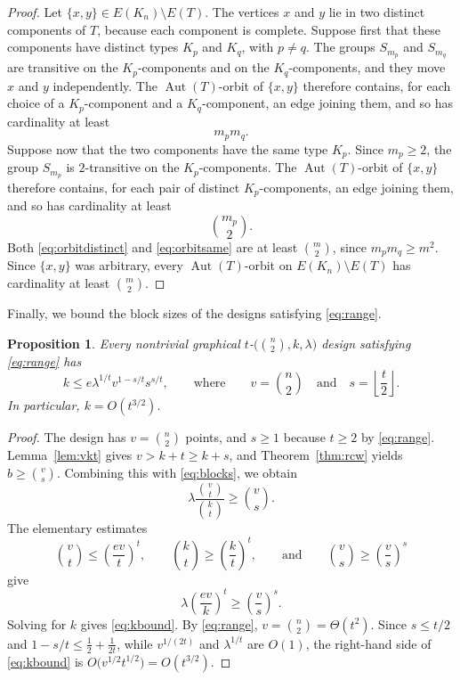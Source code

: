 \documentclass[12pt]{amsart}
\newtheorem{proposition}[theorem]{Proposition}
\theoremstyle{definition}
\DeclareMathOperator{\Aut}{Aut}
\begin{document}
\begin{proof}
Let $\{x, y\} \in E(K_n) \setminus E(T)$. The vertices $x$ and $y$ lie in
two distinct components of $T$, because each component is complete. Suppose
first that these components have distinct types $K_p$ and $K_q$, with $p
\neq q$. The groups $S_{m_p}$ and $S_{m_q}$ are transitive on the
$K_p$-components and on the $K_q$-components, and they move $x$ and $y$
independently. The $\Aut(T)$-orbit of $\{x, y\}$ therefore contains, for
each choice of a $K_p$-component and a $K_q$-component, an edge joining
them, and so has cardinality at least
\begin{equation}
\label{eq:orbitdistinct}
m_p m_q.
\end{equation}
Suppose now that the two components have the same type $K_p$. Since $m_p
\geq 2$, the group $S_{m_p}$ is $2$-transitive on the $K_p$-components. The
$\Aut(T)$-orbit of $\{x, y\}$ therefore contains, for each pair of distinct
$K_p$-components, an edge joining them, and so has cardinality at least
\begin{equation}
\label{eq:orbitsame}
\binom{m_p}{2}.
\end{equation}
Both \eqref{eq:orbitdistinct} and \eqref{eq:orbitsame} are at least
$\binom{m}{2}$, since $m_p m_q \geq m^2$. Since $\{x, y\}$ was arbitrary,
every $\Aut(T)$-orbit on $E(K_n) \setminus E(T)$ has cardinality at least
$\binom{m}{2}$.
\end{proof}

Finally, we bound the block sizes of the designs satisfying
\eqref{eq:range}.

\begin{proposition}
\label{prop:excess}
Every nontrivial graphical $t$-$\bigl(\binom{n}{2}, k, \lambda\bigr)$ design
satisfying \eqref{eq:range} has
\begin{equation}
\label{eq:kbound}
k \leq e \lambda^{1/t} v^{1 - s/t} s^{s/t},
\qquad \text{where} \qquad
v = \binom{n}{2}
\quad \text{and} \quad
s = \left\lfloor \frac{t}{2} \right\rfloor.
\end{equation}
In particular, $k = O(t^{3/2})$.
\end{proposition}

\begin{proof}
The design has $v = \binom{n}{2}$ points, and $s \geq 1$ because $t \geq 2$
by \eqref{eq:range}. Lemma~\ref{lem:vkt} gives $v > k + t \geq k + s$, and
Theorem~\ref{thm:rcw} yields $b \geq \binom{v}{s}$. Combining this with
\eqref{eq:blocks}, we obtain
\[
\lambda \frac{\binom{v}{t}}{\binom{k}{t}} \geq \binom{v}{s}.
\]
The elementary estimates
\[
\binom{v}{t} \leq \left( \frac{ev}{t} \right)^t,
\qquad
\binom{k}{t} \geq \left( \frac{k}{t} \right)^t,
\qquad \text{and} \qquad
\binom{v}{s} \geq \left( \frac{v}{s} \right)^s
\]
give
\[
\lambda \left( \frac{ev}{k} \right)^t \geq \left( \frac{v}{s} \right)^s.
\]
Solving for $k$ gives \eqref{eq:kbound}. By \eqref{eq:range}, $v =
\binom{n}{2} = \Theta(t^2)$. Since $s \leq t/2$ and $1 - s/t \leq
\frac{1}{2} + \frac{1}{2t}$, while $v^{1/(2t)}$ and $\lambda^{1/t}$ are
$O(1)$, the right-hand side of \eqref{eq:kbound} is $O\bigl(v^{1/2}
t^{1/2}\bigr) = O(t^{3/2})$.
\end{proof}
\end{document}
